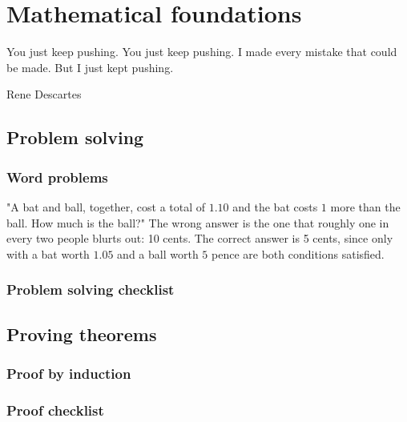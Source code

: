 \chapter{Mathematical foundations}


\epigraph{You just keep pushing. You just keep pushing. I made every mistake that could be made. But I just kept pushing.}{Rene Descartes}

\section{Problem solving}
\subsection{Word problems}
"A bat and ball, together, cost a total of $1.10$ and the bat costs $1$ more than the ball. How much is the ball?" The wrong answer is the one that roughly one in every two people blurts out: 10 cents. The correct answer is 5 cents, since only with a bat worth $1.05$ and a ball worth $5$ pence are both conditions satisfied.

\subsection{Problem solving checklist}

\section{Proving theorems}
\subsection{Proof by induction}
\subsection{Proof checklist}
